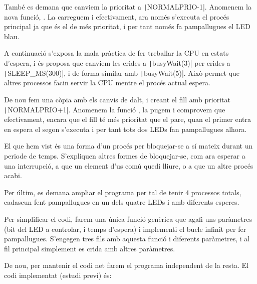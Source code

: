 També es demana que canviem la prioritat a \texttt|NORMALPRIO-1|.
Anomenem la nova funció, . La carreguem i efectivament,
ara només s'executa el procés principal ja que és el de més prioritat, i per tant
només fa pampallugues el LED blau.

A continuació s'exposa la mala pràctica de fer treballar la CPU en estats d'espera,
i és proposa que canviem les crides a \texttt|busyWait(3)| per crides a \texttt|SLEEP_MS(300)|,
i de forma similar amb \texttt|busyWait(5)|. Això permet que altres processos
facin servir la CPU mentre el procés actual espera.

De nou fem una còpia amb els canvis de dalt, i creant el fill amb
prioritat \texttt|NORMALPRIO+1|. Anomenem la funció ,
la pugem i comprovem que efectivament, encara que el fill té més prioritat que el pare,
quan el primer entra en espera el segon s'executa i per tant tots dos LEDs fan
pampallugues alhora.

El que hem vist és una forma d'un procés per bloquejar-se a sí mateix durant un periode
de temps. S'expliquen altres formes de bloquejar-se, com ara esperar a una interrupció,
a que un element d'us comú quedi lliure, o a que un altre procés acabi.

Per últim, es demana ampliar el programa per tal de tenir 4 processos totals, cadascun
fent pampallugues en un dels quatre LEDs i amb diferents esperes.

\opcional
Per simplificar el codi, farem una única funció genèrica que agafi uns paràmetres (bit del LED
a controlar, i temps d'espera) i implementi el bucle infinit per fer pampallugues. S'engegen tres
fils amb aquesta funció i diferents paràmetres, i al fil principal simplement es crida
amb altres paràmetres.

De nou, per mantenir el codi net farem el programa independent de la resta. El codi
implementat (estudi previ) és:


